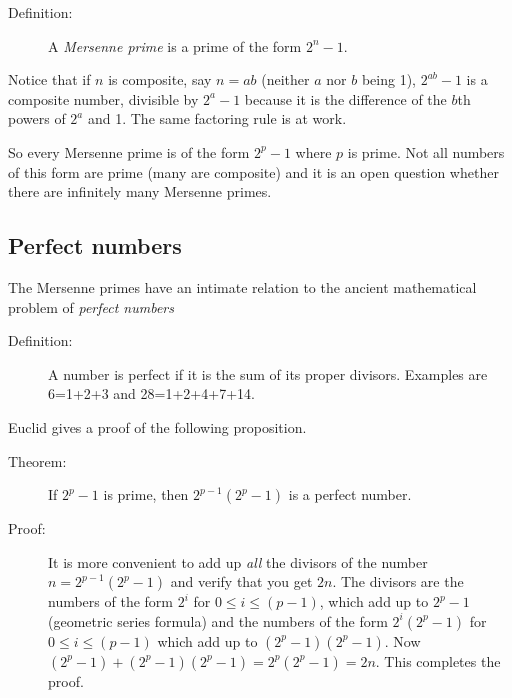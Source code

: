 \documentclass[12pt]{article}
\begin{document}
\begin{description}

\item[Definition:]  A {\em Mersenne prime\/} is a prime of the form $2^n-1$.



\end{description}

Notice that if $n$ is composite, say $n=ab$ (neither $a$ nor $b$ being 1), $2^{ab}-1$ is a composite number, divisible by $2^a-1$ because it is the difference of the $b$th powers of $2^a$ and 1.  The same factoring rule is at work.

So every Mersenne prime is of the form $2^p-1$ where $p$ is prime.  Not all numbers of this form are prime (many are composite) and it is an open question whether there are infinitely many Mersenne primes.


\subsection{Perfect numbers}

The Mersenne primes have an intimate relation to the ancient mathematical problem of {\em perfect numbers\/}

\begin{description}

\item[Definition:]  A number is perfect if it is the sum of its proper divisors.   Examples are 6=1+2+3 and 28=1+2+4+7+14.

\end{description}

Euclid gives a proof of the following proposition.

\begin{description}

\item[Theorem:]   If $2^p-1$ is prime, then $2^{p-1}(2^p-1)$ is a perfect number.

\item[Proof:]   It is more convenient to add up {\em all\/} the divisors of the number $n=2^{p-1}(2^p-1)$ and verify that you get $2n$.  The divisors are the numbers of the form $2^i$ for $0\leq i\leq (p-1)$, which add
up to $2^p-1$ (geometric series formula) and the numbers of the form $2^i(2^p-1)$ for  $0\leq i\leq (p-1)$ which add up to $(2^p-1)(2^p-1)$.  Now $(2^p-1) + (2^p-1)(2^p-1)=2^p(2^p-1)=2n$.   This completes the proof.

\end{description}
\end{document}
